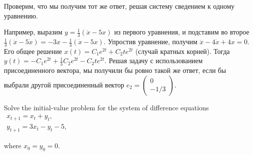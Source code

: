 \begin{solution}
Проверим, что мы получим тот же ответ, решая систему сведением к одному уравнению.

Например, выразим $y=\frac{1}{3} (\dot{x}-5x)$ из первого уравнения, и подставим во второе $\frac{1}{3} (\ddot{x}-5\dot{x})=-3x-\frac{1}{3} (\dot{x}-5x)$. Упростив уравнение, получим $\ddot{x}-4\dot{x}+4x=0$. Его общее решение $x(t)=C_{1} e^{2t} +C_{2} te^{2t} $ (случай кратных корней). Тогда $y(t)=-C_{1} e^{2t} +\frac{1}{3} C_{2} e^{2t} -C_{2} te^{2t} $. Решая задачу с использованием присоединенного вектора, мы получили бы ровно такой же ответ, если бы выбрали другой присоединенный вектор $e_{2} =\left(\begin{array}{c} {0} \\ {-1/3} \end{array}\right)$.
\end{solution}


\begin{problem}
Solve the initial-value problem for the system of difference equations $\begin{array}{c} {x_{t+1} =x_{t} +y_{t} ,} \\ {y_{t+1} =3x_{t} -y_{t} -5,} \end{array}$

where $x_{0} =y_{0} =0$.
\end{problem}


